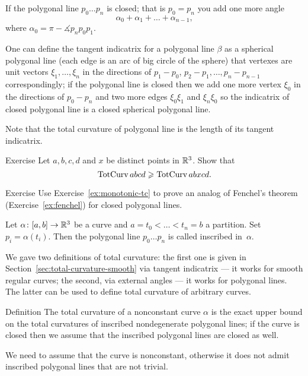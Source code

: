 If the polygonal line $p_0\dots p_n$ is closed; that is $p_0=p_n$ you add one more angle 
\[\alpha_0+\alpha_1+\dots+\alpha_{n-1},\]
where $\alpha_0=\pi-\measuredangle p_{n}p_0p_{1}$.

One can define the tangent indicatrix for a polygonal line $\beta$ as a spherical polygonal line (each edge is an arc of big circle of the sphere) that vertexes are unit vectors $\xi_1,\dots,\xi_n$ in the directions of $p_1-p_0$, $p_2-p_1,\dots, p_n-p_{n-1}$ correspondingly;
if the  polygonal line is closed then we add one more vertex $\xi_0$ in the directions of $p_0-p_n$ and two more edges $\xi_0\xi_1$ and $\xi_n\xi_0$ so the indicatrix of closed polygonal line is a closed spherical polygonal line.

Note that the total curvature of polygonal line is the length of its tangent indicatrix.

\begin{thm}{Exercise}\label{ex:monotonic-tc}
Let $a,b,c,d$ and $x$ be distinct points in $\mathbb{R}^3$.
Show that 
\[\mathop{\rm TotCurv}\nolimits abcd\geqslant \mathop{\rm TotCurv}\nolimits abxcd.\]
\end{thm}

\begin{thm}{Exercise}\label{ex:poly-fenchel}
Use Exercise~\ref{ex:monotonic-tc} to prove an analog of Fenchel's theorem (Exercise~\ref{ex:fenchel}) for closed polygonal lines.
\end{thm}


Let  $\alpha\colon[a,b]\to \mathbb{R}^3$ be a curve and  $a=t_0<\dots<t_n=b$ a partition.
Set $p_i=\alpha(t_i)$.
Then the polygonal line $p_0\dots p_n$ is called inscribed in~$\alpha$. 

We gave two definitions of total curvature:
the first one is given in Section~\ref{sec:total-curvature-smooth} via tangent indicatrix --- it works for smooth regular curves;
the second, via external angles --- it works for polygonal lines.
The latter can be used to define total curvature of arbitrary curves.

\begin{thm}{Definition}\label{def:total-curv-poly}
The total curvature of a nonconstant curve $\alpha$ is the exact upper bound on the total curvatures of inscribed nondegenerate polygonal lines;
if the curve is closed then we assume that the inscribed polygonal lines are closed as well.
\end{thm}

We need to assume that the curve is nonconstant, otherwise it does not admit inscribed polygonal lines that are not trivial.

